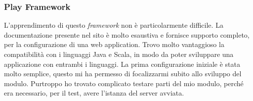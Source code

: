 \subsubsection{Play Framework}
L'apprendimento di questo \emph{framework} non è particolarmente difficile. La documentazione presente nel sito è molto esaustiva e fornisce supporto completo, per la configurazione di una web application. Trovo molto vantaggioso la compatibilità con i linguaggi Java e Scala, in modo da poter sviluppare una applicazione con entrambi i linguaggi. La prima configurazione iniziale è stata molto semplice, questo mi ha permesso di focalizzarmi subito allo sviluppo del modulo. Purtroppo ho trovato complicato testare parti del mio modulo, perché  era necessario, per il test, avere l'istanza del server avviata.




\newpage
